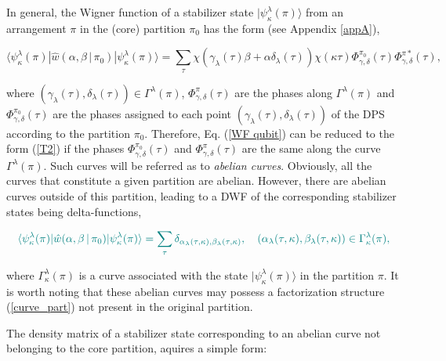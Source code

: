 \documentclass[quantumrep,article,submit,pdftex,moreauthors]{Definitions/mdpi}
\begin{document}
In general, the Wigner function of a stabilizer state $|\psi_{\kappa }^{\lambda
}(\pi )\rangle $ from an  arrangement $\pi $ in the (core) partition $\pi_{0}$
has the form (see Appendix \ref{appA}),

\begin{equation}
  \langle \psi _{\kappa }^{\lambda }(\pi )
  |\hat{w}\left( \alpha ,\beta\,|\,\pi _{0}\right)
  |\psi _{\kappa }^{\lambda }(\pi )\rangle
  = \sum_{\tau} \chi\left(
    \gamma_{\lambda }(\tau )\beta +\alpha \delta _{\lambda }(\tau)
  \right)
  \chi(\kappa \tau ) \Phi_{\gamma, \delta}^{\pi_{0}}(\tau)
  \Phi_{\gamma,\delta}^{\pi \ast}(\tau),
  \label{WF qubit}
\end{equation}

where $\left( \gamma_{\lambda }(\tau ),\delta_{\lambda }(\tau )\right) \in
\Gamma ^{\lambda }(\pi )$, $\Phi_{\gamma ,\delta }^{\pi }(\tau )$ are the phases
along $\Gamma ^{\lambda }(\pi )$ and $\Phi _{\gamma ,\delta }^{\pi_{0}}(\tau )$
are the phases assigned to each point $\left( \gamma_{\lambda }(\tau
),\delta_{\lambda }(\tau )\right) $ of the DPS according to the partition $\pi
_{0}$.  Therefore, Eq. (\ref{WF qubit}) can be reduced to the form (\ref{T2}) if
the phases $\Phi_{\gamma,\delta }^{\pi_{0}}(\tau )$ and $\Phi _{\gamma ,\delta
}^{\pi }(\tau )$ are the same along the curve $\Gamma^{\lambda }(\pi )$. Such
curves will be referred as to \textit{abelian curves}. Obviously, all the curves
that constitute a given partition are abelian. However, there are abelian curves
outside of this partition, leading to a DWF of the corresponding stabilizer
states being delta-functions,

\begin{equation}
  \color{teal}
  \langle \psi_{\kappa }^{\lambda}
  (\pi)|\hat{w} \left(\alpha ,\beta \,|\,\pi_{0}\right)
  |\psi_{\kappa }^{\lambda}(\pi)\rangle
  = \sum_{\tau }
  \delta_{\alpha_{\lambda}(\tau,\kappa),\beta_{\lambda}(\tau,\kappa)},
  \quad \left(
    \alpha_{\lambda }(\tau ,\kappa ), \beta_{\lambda }(\tau ,\kappa )
  \right) \in \Gamma_{\kappa }^{\lambda }(\pi),
\end{equation}

where {\color{teal} $\Gamma_{\kappa }^{\lambda}(\pi)$ is a curve associated with
the state $|\psi_{\kappa }^{\lambda }(\pi)\rangle$ in the partition $\pi$}. It
is worth noting that these abelian curves may possess a factorization structure
(\ref{curve_part}) not present in the original partition. 

{\color{teal}The density matrix of a stabilizer state corresponding to an
abelian curve not belonging to the core partition, aquires a simple form:}
\end{document}
